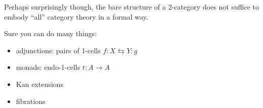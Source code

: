 \documentclass{beamer}
\begin{document}
\begin{frame}

	Perhaps surprisingly though, the bare structure of a 2-category does not suffice to embody ``all'' category theory in a formal way.

	\bigskip{}
	Sure you can do many things:
	\begin{itemize}
		\item adjunctions: pairs of 1-cells $f : X \leftrightarrows Y : g$
		\item monads: endo-1-cells $t : A\to A$
		\item Kan extensions
		\item fibrations
	\end{itemize}
\end{frame}
\end{document}
